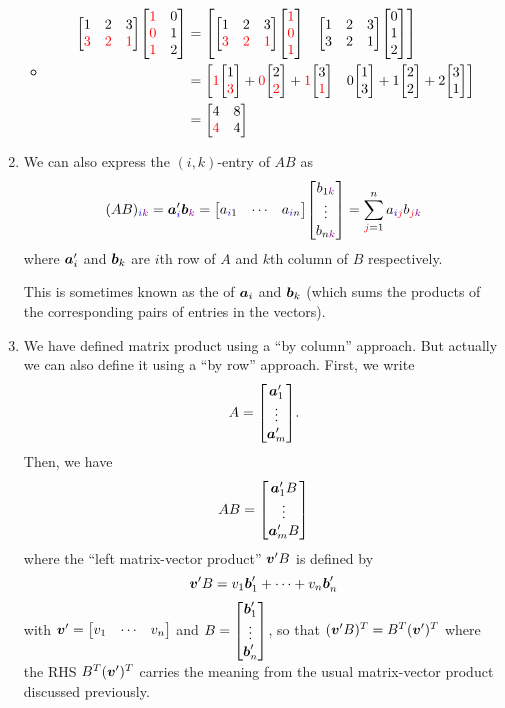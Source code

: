 \begin{enumerate}
\begin{itemize}
\item \begin{align*}
\mqty[1&2&3\\ \rc{3}&\rc{2}&\rc{1}]\mqty[\rc{1}&0\\ \rc{0}&1\\ \rc{1}&2]
&=\mqty[
\mqty[1&2&3\\ \rc{3}&\rc{2}&\rc{1}]\mqty[\rc{1}\\ \rc{0}\\ \rc{1}]
&\mqty[1&2&3\\ 3&2&1]\mqty[0\\ 1\\ 2]
]\\
&=\mqty[
\rc{1}\mqty[1\\ \rc{3}]+\rc{0}\mqty[2\\ \rc{2}]+\rc{1}\mqty[3\\ \rc{1}]
&0\mqty[1\\ 3]+1\mqty[2\\ 2]+2\mqty[3\\ 1]
]\\
&=\mqty[4&8\\ \rc{4}&4]
\end{align*}
\end{itemize}
\item We can also express the \((i,k)\)-entry of \(AB\) as
\[
(AB)_{\blc{i}\vc{k}}=\vect{a}_{\blc{i}}'\vect{b}_{\vc{k}}
=\mqty[a_{\blc{i}1}&\cdots&a_{\blc{i}n}]
\mqty[b_{1\vc{k}}\\\vdots\\b_{n\vc{k}}]
=\sum_{\rc{j}=1}^{n}a_{\blc{i}\rc{j}}b_{\rc{j}\vc{k}}
\]
where \(\vb*{a}_{i}'\) and \(\vb*{b}_{k}\) are \(i\)th row of \(A\) and
\(k\)th column of \(B\) respectively. \begin{note}
This is sometimes known as the  of \(\vb*{a}_{i}\) and
\(\vb*{b}_{k}\) (which sums the products of the corresponding pairs of entries
in the vectors).
\end{note}

\item We have defined matrix product using a ``by column'' approach. But
actually we can also define it using a ``by row'' approach. First, we write
\[
A=\mqty[\vect{a}_{1}'\\ \vdots\\ \vect{a}_{m}'].
\]
Then, we have
\[
AB=\mqty[\vect{a}_{1}'B\\ \vdots\\ \vect{a}_{m}'B]
\]
where the ``left matrix-vector product'' \(\vb*{v}'B\) is defined by
\[
\vb*{v}'B=v_1\vb*{b}_{1}'+\dotsb+v_n\vb*{b}_{n}'
\]
with \(\vect{v}'=\mqty[v_1&\cdots&v_n]\) and \(\displaystyle
B=\mqty[\vect{b}_{1}'\\ \vdots\\ \vect{b}_{n}']\), so that
\((\vb*{v}'B)^{T}=B^T(\vb*{v}')^T\) where the RHS \(B^T(\vb*{v}')^T\)
carries the meaning from the usual matrix-vector product discussed previously.


\end{enumerate}
